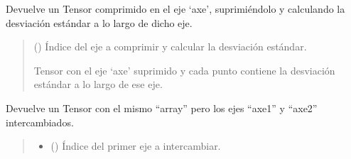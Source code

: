 \documentclass[letterpaper,10pt,english]{sphinxmanual}
\begin{document}
\begin{fulllineitems}
\begin{fulllineitems}
\begin{quote}
\begin{description}
\sphinxAtStartPar
{\hyperref[\detokenize{myutils:myutils.tensor.Tensor}]{}}

\end{description}\end{quote}

\end{fulllineitems}


\begin{fulllineitems}
\label{\detokenize{myutils:myutils.tensor.Tensor.std}}
\pysigstartsignatures
{}
\pysigstopsignatures
\sphinxAtStartPar
Devuelve un Tensor comprimido en el eje ‘axe’, suprimiéndolo y calculando la desviación estándar a lo largo de dicho eje.
\begin{quote}\begin{description}
\sphinxAtStartPar
{} () \textendash{} Índice del eje a comprimir y calcular la desviación estándar.

\sphinxAtStartPar
Tensor con el eje ‘axe’ suprimido y cada punto contiene la desviación estándar a lo largo de ese eje.

\sphinxAtStartPar
{\hyperref[\detokenize{myutils:myutils.tensor.Tensor}]{}}

\end{description}\end{quote}

\end{fulllineitems}


\begin{fulllineitems}
\label{\detokenize{myutils:myutils.tensor.Tensor.swap}}
\pysigstartsignatures
{}
\pysigstopsignatures
\sphinxAtStartPar
Devuelve un Tensor con el mismo “array” pero los ejes “axe1” y “axe2” intercambiados.
\begin{quote}\begin{description}
\begin{itemize}
\item {} 
\sphinxAtStartPar
{} () \textendash{} Índice del primer eje a intercambiar.


\end{itemize}
\end{description}
\end{quote}
\end{fulllineitems}
\end{fulllineitems}
\end{document}
